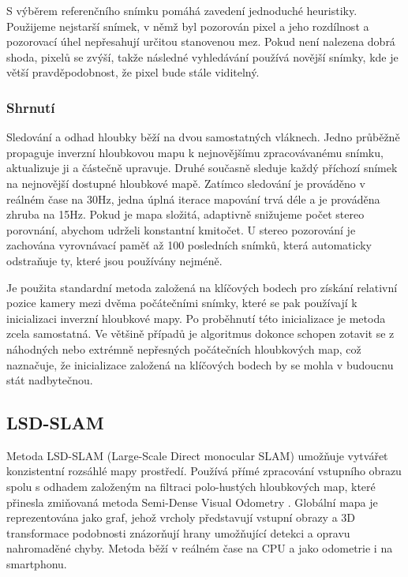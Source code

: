 \documentclass[12pt,a4paper]{article}
\begin{document}
S výběrem referenčního snímku pomáhá zavedení jednoduché heuristiky. Použijeme nejstarší snímek, v němž byl pozorován pixel a jeho rozdílnost a pozorovací úhel nepře\-sahují určitou stanovenou mez. Pokud není nalezena dobrá shoda,  pixelů se zvýší, takže následné vyhledávání používá novější snímky, kde je větší pravděpodobnost, že pixel bude stále viditelný.


\subsubsection*{Shrnutí}
Sledování a odhad hloubky běží na dvou samostatných vláknech. Jedno průběžně propaguje inverzní hloubkovou mapu k nejnovějšímu zpracovávanému snímku, aktualizuje ji a částečně upravuje. Druhé současně sleduje každý příchozí snímek na nejnovější dostupné hloubkové mapě. Zatímco sledování je prováděno v reálném čase na 30Hz, jedna úplná iterace mapování trvá déle a je prováděna zhruba na 15Hz. Pokud je mapa složitá, adaptivně snižujeme počet stereo porovnání, abychom udrželi konstantní kmitočet. U stereo pozorování je zachována vyrovnávací paměť až 100 posledních snímků, která automaticky odstraňuje ty, které jsou používány nejméně.

Je použita standardní metoda založená na klíčových bodech pro získání relativní pozice kamery mezi dvěma počátečními snímky, které se pak používají k inicializaci inverzní hloubkové mapy. Po proběhnutí této inicializace je metoda zcela samostatná. Ve většině případů je algoritmus dokonce schopen zotavit se z náhodných nebo extrémně nepřesných počátečních hloubkových map, což naznačuje, že inicializace založená na klíčových bodech by se mohla v budoucnu stát nadbytečnou.

\subsection{LSD-SLAM}
Metoda LSD-SLAM (Large-Scale Direct monocular SLAM) umožňuje vytvářet konzistentní rozsáhlé mapy prostředí. Používá přímé zpracování vstupního obrazu spolu s odhadem založeným na filtraci polo-hustých hloubkových map, které přinesla zmiňovaná metoda Semi-Dense Visual Odometry \cite{Semi-Dense_VO}. Globální mapa je reprezentována jako graf, jehož vrcholy představují vstupní obrazy a 3D transformace podobnosti znázorňují hrany umožňující detekci a opravu nahromaděné chyby. Metoda běží v reálném čase na CPU a jako odometrie i na smartphonu.
\end{document}
